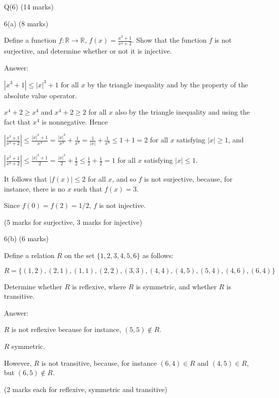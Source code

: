 \documentclass[a4paper,12pt,oneside]{book}
\theoremstyle{definition}
\begin{document}
\newpage

Q(6) (14 marks)

6(a) (8 marks)

Define a function $f : \mathbb{R} \rightarrow \mathbb{R}$, $f(x) = \frac{x^3+1}{x^4+2}$. Show that the function $f$ is not surjective, and determine whether or not it is injective.

Answer:

$|x^3+1| \leq |x|^3 + 1$ for all $x$ by the triangle inequality and by the property of the absolute value operator.

$x^4 +2 \geq x^4$ and $x^4 +2 \geq 2$  for all $x$ also by the triangle inequality and using the fact that $x^4$ is nonnegative. Hence

$\left| \frac{x^3+1}{x^4+2} \right| \leq \frac{|x|^3 + 1}{x^4} = \frac{|x|^3}{x^4} + \frac{1}{x^4} = \frac{1}{|x|}  +  \frac{1}{x^4} \leq 1+1=2$ for all $x$ satisfying $|x| \geq 1$, and

$\left| \frac{x^3+1}{x^4+2} \right| \leq \frac{|x|^3 + 1}{2} = \frac{|x|^3}{2} + \frac{1}{2} \leq \frac{1}{2} + \frac{1}{2} = 1$ for all $x$ satisfying $|x| \leq 1$.

It follows that $|f(x)| \leq 2$ for all $x$, and so $f$ is not surjective, because, for instance, there is no $x$ such that $f(x)=3$.

Since $f(0) = f(2) = 1/2$, $f$ is not injective.

(5 marks for surjective, 3 marks for injective)

6(b) (6 marks)

Define a relation $R$ on the set $\{1,2,3,4,5,6\}$ as follows:

$R = \{(1,2), (2,1), (1,1), (2,2), (3,3), (4,4), (4,5), (5,4), (4,6), (6,4)\}$ 

Determine whether $R$ is reflexive, where $R$ is symmetric, and whether $R$ is transitive.

Answer:

$R$ is not reflexive because for instance, $(5,5) \notin R$.

$R$ symmetric.

However, $R$ is not transitive, because, for instance $(6,4) \in R$ and $(4,5) \in R$, but $(6,5) \notin R$.

(2 marks each for reflexive, symmetric and transitive)
\end{document}
